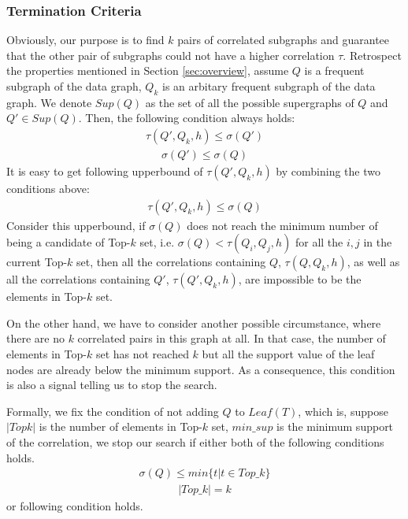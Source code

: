 \subsubsection{Termination Criteria}
\label{subsubsec:exact_algo_ceasing}
Obviously, our purpose is to find $k$ pairs of correlated subgraphs and guarantee that the other pair of subgraphs could not have a higher correlation $\tau$. Retrospect the properties mentioned in Section \ref{sec:overview}, assume $Q$ is a frequent subgraph of the data graph, $Q_k$ is an arbitary frequent subgraph of the data graph. We denote $Sup(Q)$ as the set of all the possible supergraphs of $Q$ and $Q'\in Sup(Q)$. Then, the following condition always holds:
\begin{align*} \tau(Q',Q_k,h)\le \sigma(Q') \end{align*}
\begin{align*} \sigma(Q')\le \sigma(Q) \end{align*}
It is easy to get following upperbound of $\tau(Q',Q_k,h)$ by combining the two conditions above:
\begin{align*} \tau(Q',Q_k,h) \le \sigma(Q) \end{align*}
Consider this upperbound, if $\sigma(Q)$ does not reach the minimum number of
being a candidate of {\sf Top-$k$} set, i.e. $\sigma(Q)<\tau(Q_i,Q_j,h)$ for all
the $i, j$ in the current {\sf Top-$k$} set, then all the correlations
containing $Q$, $\tau(Q,Q_k,h)$, as well as all the correlations containing
$Q'$, $\tau(Q',Q_k,h)$, are impossible to be the elements in {\sf Top-$k$} set.
\par On the other hand, we have to consider another possible circumstance, where
there are no $k$ correlated pairs in this graph at all. In that case, the number
of elements in {\sf Top-$k$} set has not reached $k$ but all the support value
of the leaf nodes are already below the minimum support. As a consequence, this
condition is also a signal telling us to stop the search. \par Formally, we fix
the condition of not adding $Q$ to $Leaf(T)$, which is, suppose $|Topk|$ is the
number of elements in {\sf Top-$k$} set, $min\_sup$ is the minimum support of
the correlation, we stop our search if either both of the following conditions
holds.
\begin{align*} \sigma(Q)\le min\{t|t\in Top\_k\}\end{align*}
\begin{align*} |Top\_k|=k \end{align*}
or following condition holds.
